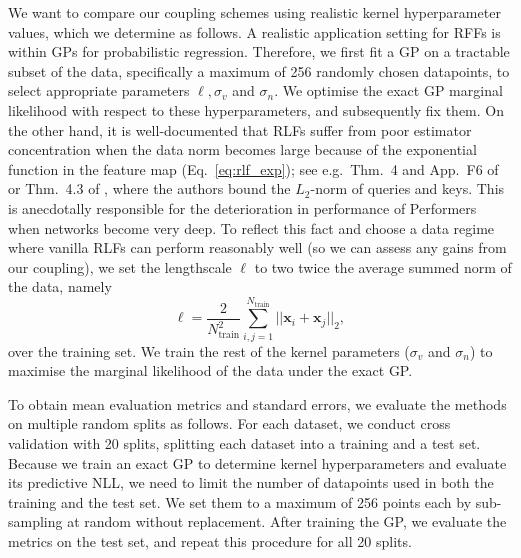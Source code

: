 We want to compare our coupling schemes using realistic kernel hyperparameter values, which we determine as follows.
A realistic application setting for RFFs is within GPs for probabilistic regression.
Therefore, we first fit a GP on a tractable subset of the data, specifically a maximum of 256 randomly chosen datapoints, to select appropriate parameters  $\ell, \sigma_v$ and $\sigma_n.$
We optimise the exact GP marginal likelihood with respect to these hyperparameters, and subsequently fix them.
On the other hand, it is well-documented that RLFs suffer from poor estimator concentration when the data norm becomes large because of the exponential function in the feature map (Eq.~\ref{eq:rlf_exp}); see e.g.~Thm.~4 and App.~F6 of \citet{choromanski2020rethinking} or Thm.~4.3 of \citet{likhosherstov2022chefs}, where the authors bound the $L_2$-norm of queries and keys. 
This is anecdotally responsible for the deterioration in performance of Performers when networks become very deep. 
To reflect this fact and choose a data regime where vanilla RLFs can perform reasonably well (so we can assess any gains from our coupling), we set the lengthscale $\ell$ to two twice the average summed norm of the data, namely
\begin{equation}
    \ell = \frac{2}{N_\textrm{train}^2} \sum_{i,j=1}^{N_\textrm{train}} ||\boldsymbol{x}_i + \boldsymbol{x}_j||_2,
\end{equation}
over the training set.
We train the rest of the kernel parameters ($\sigma_v$ and $\sigma_n$) to maximise the marginal likelihood of the data under the exact GP.


To obtain mean evaluation metrics and standard errors, we evaluate the methods on multiple random splits as follows.
For each dataset, we conduct cross validation with 20 splits, splitting each dataset into a training and a test set.
Because we train an exact GP to determine kernel hyperparameters and evaluate its predictive NLL, we need to limit the number of datapoints used in both the training and the test set. 
We set them to a maximum of 256 points each by sub-sampling at random without replacement.
After training the GP, we evaluate the metrics on the test set, and repeat this procedure for all 20 splits.

